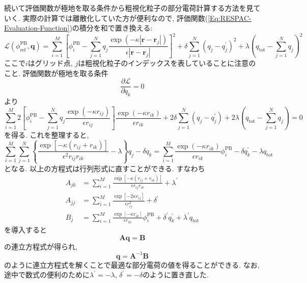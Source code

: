 続いて評価関数が極地を取る条件から粗視化粒子の部分電荷計算する方法を見ていく.
実際の計算では離散化していた方が便利なので, 評価関数(\ref{Eq:RESPAC-Evaluation-Function})の積分を和で置き換える:
\begin{equation}
    \mathcal{L} (\phi_{\mathrm{ref}}^{\mathrm{PB}}, \bm{q})
    =
    \sum_{i=1}^{M}
    \left[
        \phi_{i}^{\mathrm{PB}}
        -
        \sum_{j=1}^{N}
        q_{j}
        \frac{\exp(-\kappa |\bm{r} - \bm{r}_{j}|)}{\epsilon |\bm{r} - \bm{r}_{j}|}
    \right]^{2}
    +
    \delta \sum_{j=1}^{N} (q_{j} - q_{j}^{\prime})^{2}
    +
    \lambda(q_{\mathrm{tot}} - \sum_{j=1}^{N} q_{j})^{2}
    \label{Eq:RESPAC-Evaluation-Function-Discrete}
\end{equation}
ここで$i$はグリッド点, $j$は粗視化粒子のインデックスを表していることに注意のこと.
評価関数が極地を取る条件
\begin{equation}
    \frac{\partial \mathcal{L}}{\partial q_{k}} = 0
\end{equation}
より
\begin{equation}
    \sum_{i=1}^{M}
    2
    \left[
        \phi_{i}^{\mathrm{PB}}
        -
        \sum_{j=1}^{N}
        q_{j}
        \frac{\exp(-\kappa r_{ij})}{\epsilon r_{ij}}
    \right]
    \frac{\exp(-\kappa r_{ik})}{\epsilon r_{ik}}
    +
    2 \delta \sum_{j=1}^{N} (q_{j} - q_{j}^{\prime})
    +
    2 \lambda(q_{\mathrm{tot}} - \sum_{j=1}^{N} q_{j})
    =
    0
\end{equation}
を得る. これを整理すると,
\begin{equation}
    \sum_{i=1}^{M} \sum_{j=1}^{N}
    \left\{
        \frac{\exp[-\kappa (r_{ij} + r_{ik})]}{\epsilon^{2} r_{ij}r_{ik}}
        -
        \lambda
    \right\} q_{j}
    -
    \delta q_{k}
    =
    \sum_{i=1}^{M}
    \frac{\exp(-\kappa r_{ik})}{\epsilon r_{ik}} \phi_{i}^{\mathrm{PB}}
    -
    \delta q_{k}^{\prime}
    -
    \lambda q_{\mathrm{tot}}
\end{equation}
となる. 以上の方程式は行列形式に直すことができる. すなわち
\begin{align}
    A_{jk}
    &=
    \sum_{i=1}^{M}
    \frac{\exp[-\kappa(r_{ij} + r_{ik})]}{\epsilon r_{ij}r_{ik}} + \lambda^{\prime}
    \\
    A_{jj}
    &=
    \sum_{i=1}^{M}
    \frac{\exp[-2\kappa r_{ij}]}{\epsilon r_{ij}^{2}} + \delta^{\prime}
    \\
    B_{j}
    &=
    \sum_{i=1}^{M}
    \frac{\exp[-\kappa r_{ik}]}{\epsilon r_{ik}} \phi_{i}^{\mathrm{PB}}
    +
    \delta^{\prime} q_{k}^{\prime}
    +
    \lambda^{\prime} q_{\mathrm{tot}}
\end{align}
を導入すると
\begin{equation}
    \bm{A} \bm{q} = \bm{B}
\end{equation}
の連立方程式が得られ,
\begin{equation}
    \bm{q} = \bm{A}^{-1}\bm{B}
\end{equation}
のように連立方程式を解くことで最適な部分電荷の値を得ることができる.
なお, 途中で数式の便利のために$\lambda^{\prime} = -\lambda$, $\delta^{\prime} = -\delta$のように置き直した.


